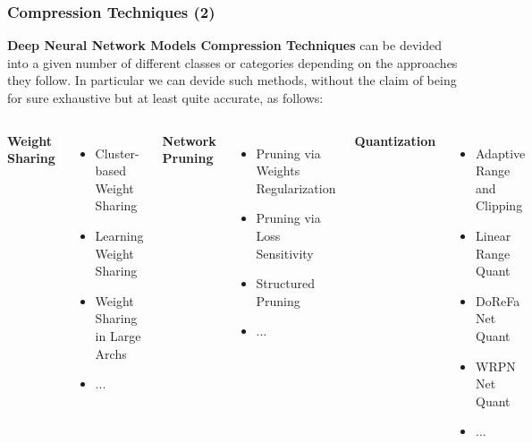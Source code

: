 


\begin{frame}
    \frametitle{Compression Techniques (2)}
        \textbf{Deep Neural Network Models Compression Techniques} can be devided into a given number of different classes or categories depending on
        the approaches they follow. In particular we can devide such methods, without the claim of being for sure exhaustive but at least quite accurate,
        as follows:

        \begin{columns}

                \textbf{Weight Sharing}
                \begin{itemize}
                \item Cluster-based Weight Sharing
                \item Learning Weight Sharing
                \item Weight Sharing in Large Archs
                \item ...
                \end{itemize}


                \textbf{Network Pruning}
                \begin{itemize}
                \item Pruning via Weights Regularization
                \item Pruning via Loss Sensitivity
                \item Structured Pruning
                \item ...
                \end{itemize}


                \textbf{Quantization}
                \begin{itemize}
                \item Adaptive Range and Clipping
                \item Linear Range Quant
                \item DoReFa Net Quant
                \item WRPN Net Quant
                \item ...
                \end{itemize}



\end{columns}
\end{frame}
